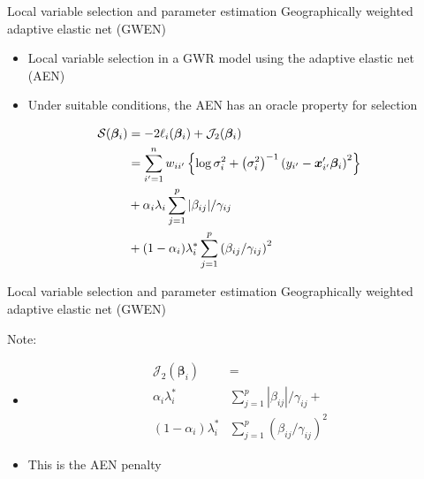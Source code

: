 \documentclass[12pt,t]{beamer}
\newcommand{\subt}[1]{{\footnotesize \color{subtitle} {#1}}}
\begin{document}
\begin{frame}{Local variable selection and  parameter estimation}
\subt{Geographically weighted adaptive elastic net (GWEN)}

\bigskip
\begin{itemize}
    \item Local variable selection in a GWR model using the adaptive elastic net (AEN) \citep{Zou:2009}
    \item Under suitable conditions, the AEN has an oracle property for selection
\end{itemize}
\begin{align*}
		\mathcal{S}(\bm{\beta}_i) &= -2 \ell_i(\bm{\beta}_i) + \mathcal{J}_2(\bm{\beta}_i) \notag \\
		&= \sum_{i'=1}^n w_{ii'}  \left\{ \log{\sigma^2_i}  + \left(\sigma^2_i\right)^{-1}  \left(y_{i'} - \bm{x}'_{i'} \bm{\beta}_i \right)^2 \right\}   \notag \\
		&+ \alpha_i \lambda_i \sum_{j=1}^p |\beta_{ij}| / \gamma_{ij} \notag \\
		&+ (1-\alpha_i) \lambda^*_i \sum_{j=1}^p  \left( \beta_{ij} / \gamma_{ij} \right)^2 \notag
\end{align*}

\end{frame}



\begin{frame}{Local variable selection and  parameter estimation}
\subt{Geographically weighted adaptive elastic net (GWEN)}

\bigskip
Note:
\begin{itemize}
  \item
    \begin{align*}
    \mathcal{J}_2(\bm{\beta}_i) &= \\
    \alpha_i \lambda^*_i &\sum_{j=1}^p |\beta_{ij}| / \gamma_{ij} + \\
    (1-\alpha_i) \lambda^*_i &\sum_{j=1}^p  \left( \beta_{ij} / \gamma_{ij} \right)^2
    \end{align*}
  \item This is the AEN penalty
\end{itemize}

\end{frame}
\end{document}
